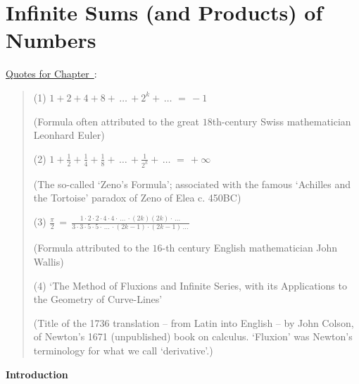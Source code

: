 
% 
%

                  \chapter{Infinite Sums (and Products) of Numbers}
                  \label{ChaptG}


        \underline{Quotes for Chapter~}: 

\V

\begin{quotation}
{\footnotesize
        (1) $1+2+4+8+\,{\ldots}\,+2^{k}+\,{\ldots}\, \,=\, -1$

        (Formula often attributed to the great $18$th-century Swiss mathematician Leonhard Euler)

\V

        (2) ${\displaystyle 1 + \frac{1}{2} + \frac{1}{4} + \frac{1}{8} +\,{\ldots}\,+\frac{1}{2^{k}} + \,{\ldots}\, } \,=\, +{\infty}$

        (The so-called `Zeno's Formula'; associated with the famous `Achilles and the Tortoise' paradox of Zeno of Elea c. 450BC)

\V

        (3) ${\displaystyle \frac{{\pi}}{2} \,=\, \frac{1{\cdot}2{\cdot}2{\cdot}4{\cdot}4{\cdot}\,{\ldots}\,{\cdot}(2k)(2k){\cdot}\,{\ldots}\,}{3{\cdot}3{\cdot}5{\cdot}5{\cdot}\,{\ldots}\,{\cdot}(2k-1){\cdot}(2k-1)\,{\ldots}\,}}$

        (Formula attributed to the $16$-th century English mathematician John Wallis)

\V

        (4) `The Method of Fluxions and Infinite Series, with its Applications to the Geometry of Curve-Lines'

        (Title of the 1736 translation -- from Latin into English -- by John Colson, of Newton's 1671 (unpublished) book on calculus. `Fluxion' was Newton's terminology for what we call `derivative'.)

}%
\end{quotation}

\V
\V

            \small{\bf Introduction}

\V

